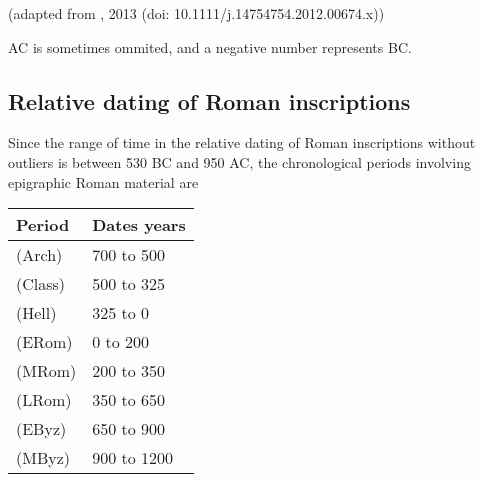 \documentclass[a4paper,12pt,english]{sphinxhowto}
\begin{document}
(adapted from , 2013 (doi: 10.1111/j.1475\sphinxhyphen{}4754.2012.00674.x))


AC is sometimes ommited, and a negative number represents BC.



\subsection{Relative dating of Roman inscriptions}
\label{\detokenize{Time:relative-dating-of-roman-inscriptions}}\label{\detokenize{Time:edhrd}}
Since the range of time in the relative dating of Roman inscriptions without outliers is between 530 BC and 950 AC,
the chronological periods involving epigraphic Roman material are


\begin{savenotes}\sphinxattablestart
\raggedright
\begin{tabulary}{\linewidth}[t]{|T|T|}
\hline
\sphinxstyletheadfamily 
Period
&\sphinxstyletheadfamily 
Dates years
\\
\hline
{}  (Arch)
&
\sphinxhyphen{}700 to \sphinxhyphen{}500
\\
\hline
{} (Class)
&
\sphinxhyphen{}500 to \sphinxhyphen{}325
\\
\hline
{}  (Hell)
&
\sphinxhyphen{}325 to 0
\\
\hline
{}  (ERom)
&
0 to 200
\\
\hline
{}  (MRom)
&
200 to 350
\\
\hline
{}  (LRom)
&
350 to 650
\\
\hline
{} (EByz)
&
650 to 900
\\
\hline
{} (MByz)
&
900 to 1200
\\
\hline
\end{tabulary}
\par
\sphinxattableend\end{savenotes}
\end{document}
